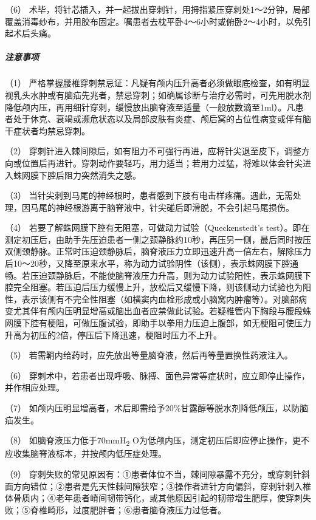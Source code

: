 （6）
术毕，将针芯插入，并一起拔出穿刺针，用拇指紧压穿刺处1～2分钟，局部覆盖消毒纱布，并用胶布固定。嘱患者去枕平卧4～6小时或俯卧2～4小时，以免引起术后头痛。

\subparagraph{注意事项}

（1）
严格掌握腰椎穿刺禁忌证：凡疑有颅内压升高者必须做眼底检查，如有明显视乳头水肿或有脑疝先兆者，禁忌穿刺；如确属诊断与治疗必需时，可先用脱水剂降低颅内压，再用细针穿刺，缓慢放出脑脊液至适量（一般放数滴至1ml）。凡患者处于休克、衰竭或濒危状态以及局部皮肤有炎症、颅后窝的占位性病变或伴有脑干症状者均禁忌穿刺。

（2）
穿刺针进入棘间隙后，如有阻力不可强行再进，应将针尖退至皮下，调整方向或位置后再进针。穿刺动作要轻巧，用力适当；若用力过猛，将难以体会针尖进入蛛网膜下腔后阻力突然消失之感。

（3）
当针尖刺到马尾的神经根时，患者感到下肢有电击样疼痛。遇此，无需处理，因马尾的神经根游离于脑脊液中，针尖碰后即滑脱，不会引起马尾损伤。

（4） 若要了解蛛网膜下腔有无阻塞，可做动力试验（Queckenstedt's
test）。即在测定初压后，由助手先压迫患者一侧之颈静脉约10秒，再压另一侧，最后同时按压双侧颈静脉。正常时压迫颈静脉后，脑脊液压力立即迅速升高一倍左右，解除压力后10～20秒，又降至原来水平，称为动力试验阴性（该侧），表示蛛网膜下腔通畅。若压迫颈静脉后，不能使脑脊液压力升高，则为动力试验阳性，表示蛛网膜下腔完全阻塞。若压迫后压力缓慢上升，放松后又缓慢下降，则该侧动力试验也为阳性，表示该侧有不完全性阻塞（如横窦内血栓形成或小脑窝内肿瘤等）。对脑部病变尤其伴有颅内压明显增高或脑出血者应禁做此试验。若疑椎管内下胸段与腰段蛛网膜下腔有梗阻，可做压腹试验，即助手以拳用力压迫上腹部，如无梗阻可使压力升高为初压的2倍，停压后下降迅速，梗阻时压力不上升。

（5） 若需鞘内给药时，应先放出等量脑脊液，然后再等量置换性药液注入。

（6）
穿刺术中，若患者出现呼吸、脉搏、面色异常等症状时，应立即停止操作，并作相应处理。

（7）
如颅内压明显增高者，术后即需给予20\%甘露醇等脱水剂降低颅压，以防脑疝发生。

（8） 如脑脊液压力低于70mmH\textsubscript{2}
O为低颅内压，测定初压后即应停止操作，更不应收集脑脊液标本，并按颅内低压症处理。

（9）
穿刺失败的常见原因有：①患者体位不当，棘间隙暴露不充分，或穿刺针斜面方向错位；②患者是先天性棘间隙狭窄；③操作者进针方向偏斜，穿刺针刺入椎体骨质内；④老年患者嵴间韧带钙化，或其他原因引起的韧带增生肥厚，使穿刺失败；⑤脊椎畸形，过度肥胖者；⑥患者脑脊液压力过低者。

\protect\hypertarget{text00379.html}{}{}

